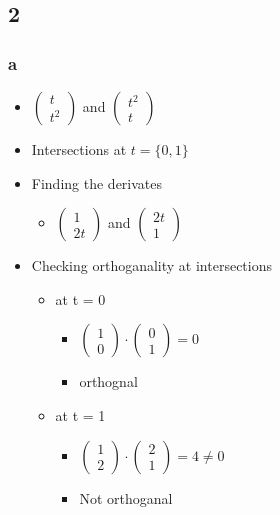 \documentclass[]{article}
\providecommand{\tightlist}{%
  \setlength{\itemsep}{0pt}\setlength{\parskip}{0pt}}
\begin{document}
\hypertarget{section-1}{%
\subsection{2}\label{section-1}}

\hypertarget{a-1}{%
\subsubsection{a}\label{a-1}}

\begin{itemize}
\tightlist
\item
  \(\begin{pmatrix} t \\ t^2 \end{pmatrix}\) and
  \(\begin{pmatrix} t^2 \\ t \end{pmatrix}\)
\item
  Intersections at \(t = \{ 0,1\}\)
\item
  Finding the derivates

  \begin{itemize}
  \tightlist
  \item
    \(\begin{pmatrix} 1 \\ 2t \end{pmatrix}\) and
    \(\begin{pmatrix} 2t \\ 1 \end{pmatrix}\)
  \end{itemize}
\item
  Checking orthoganality at intersections

  \begin{itemize}
  \tightlist
  \item
    at t = 0

    \begin{itemize}
    \tightlist
    \item
      \(\begin{pmatrix} 1 \\ 0 \end{pmatrix} \cdot \begin{pmatrix} 0 \\ 1 \end{pmatrix} = 0\)
    \item
      orthognal
    \end{itemize}
  \item
    at t = 1

    \begin{itemize}
    \tightlist
    \item
      \(\begin{pmatrix} 1 \\ 2 \end{pmatrix} \cdot \begin{pmatrix} 2 \\ 1 \end{pmatrix} = 4 \neq 0\)
    \item
      Not orthoganal
    \end{itemize}
  \end{itemize}
\end{itemize}
\end{document}

